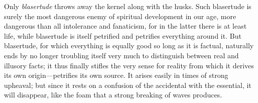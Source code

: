 \documentclass[12pt,a4paper]{article}
\begin{document}
Only \emph{blasertude} throws away the kernel along with the husks. Such
blasertude is surely the most dangerous enemy of spiritual development in
our age, more dangerous than all intolerance and fanaticism, for in the
latter there is at least life, while blasertude is itself petrified and
petrifies everything around it. But blasertude, for which everything is
equally good so long as it is factual, naturally ends by no longer
troubling itself very much to distinguish between real and illusory facts;
it thus finally stifles the very sense for reality from which it derives
its own origin---petrifies its own source. It arises easily in times of
strong upheaval; but since it rests on a confusion of the accidental with
the essential, it will disappear, like the foam that a strong breaking of
waves produces.
\end{document}
